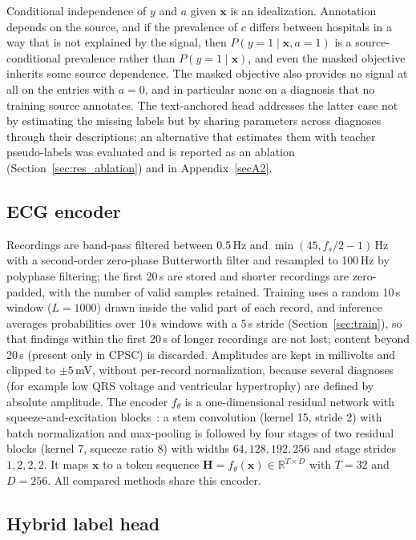 \begin{remark}
Conditional independence of $y$ and $a$ given $\mathbf{x}$ is an idealization. Annotation depends on the source, and if the prevalence of $c$ differs between hospitals in a way that is not explained by the signal, then $P(y=1\mid\mathbf{x},a=1)$ is a source-conditional prevalence rather than $P(y=1\mid\mathbf{x})$, and even the masked objective inherits some source dependence. The masked objective also provides no signal at all on the entries with $a=0$, and in particular none on a diagnosis that no training source annotates. The text-anchored head addresses the latter case not by estimating the missing labels but by sharing parameters across diagnoses through their descriptions; an alternative that estimates them with teacher pseudo-labels was evaluated and is reported as an ablation (Section~\ref{sec:res_ablation}) and in Appendix~\ref{secA2}.
\end{remark}

\subsection{ECG encoder}\label{sec:encoder}
Recordings are band-pass filtered between 0.5\,Hz and $\min(45, f_s/2-1)$\,Hz with a second-order zero-phase Butterworth filter and resampled to 100\,Hz by polyphase filtering; the first 20\,s are stored and shorter recordings are zero-padded, with the number of valid samples retained. Training uses a random 10\,s window ($L=1000$) drawn inside the valid part of each record, and inference averages probabilities over 10\,s windows with a 5\,s stride (Section~\ref{sec:train}), so that findings within the first 20\,s of longer recordings are not lost; content beyond 20\,s (present only in CPSC) is discarded. Amplitudes are kept in millivolts and clipped to $\pm5$\,mV, without per-record normalization, because several diagnoses (for example low QRS voltage and ventricular hypertrophy) are defined by absolute amplitude. The encoder $f_\theta$ is a one-dimensional residual network with squeeze-and-excitation blocks~\cite{he2016,hu2018se}: a stem convolution (kernel 15, stride 2) with batch normalization and max-pooling is followed by four stages of two residual blocks (kernel 7, squeeze ratio 8) with widths $64,128,192,256$ and stage strides $1,2,2,2$. It maps $\mathbf{x}$ to a token sequence $\mathbf{H}=f_\theta(\mathbf{x})\in\mathbb{R}^{T\times D}$ with $T=32$ and $D=256$. All compared methods share this encoder.

\subsection{Hybrid label head}\label{sec:head}
